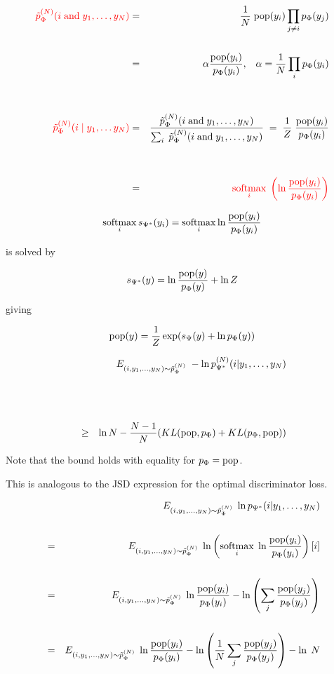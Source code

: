 {
{\huge
\begin{eqnarray*}
{\color{red} \tilde{p}_\Phi^{(N)}(i \;\mathrm{and}\;y_1,\ldots,y_{N})} & = & \frac{1}{N}\;\mathrm{pop}(y_i)\prod_{j \not = i}p_\Phi(y_j) \\
\\
& = & \alpha \frac{\mathrm{pop}(y_i)}{p_\Phi(y_i)},\;\;\;\alpha = \frac{1}{N} \prod_i p_\Phi(y_i) \\
\\
\\
{\color{red} \tilde{p}_\Phi^{(N)}(i\;|\;y_1,\ldots y_{N})} & = & \frac{\tilde{p}_\Phi^{(N)}(i\;\mbox{and} \; y_1,\ldots,y_{N})}{\sum_i \;\tilde{p}_\Phi^{(N)}(i \;\mbox{and}\; y_1,\ldots,y_{N})} \;=\;\frac{1}{Z} \;\frac{\mathrm{pop}(y_i)}{p_\Phi(y_i)} \\
\\
\\
& = & {\color{red} \operatorname*{softmax}_i\; \left(\ln \frac{\mathrm{pop}(y_i)}{p_\Phi(y_i)}\right)}
\end{eqnarray*}
}


$$\operatorname*{softmax}_i s_{\Psi^*}(y_i) =  \operatorname*{softmax}_i \ln \frac{\mathrm{pop}(y_i)}{p_\Phi(y_i)}$$

\vfill
is solved by

\vfill
$$s_{\Psi^*}(y) = \ln \frac{\mathrm{pop}(y)}{p_\Phi(y)} + \ln Z$$

\vfill
giving

$$\mathrm{pop}(y) = \frac{1}{Z} \exp(s_\Psi(y) + \ln p_\Phi(y))$$


\begin{eqnarray*}
  && E_{(i,y_1,\dots,y_{N}) \sim \tilde{p}_\Phi^{(N)}}\;- \ln p^{(N)}_{\Psi^*}(i|y_1,\ldots,y_{N}) \\
  \\
  \\
  \\
  & \geq & \ln N - \frac{N-1}{N}(KL(\mathrm{pop},p_\Phi) + KL(p_\Phi,\mathrm{pop}))
\end{eqnarray*}

\vfill
Note that the bound holds with equality for $p_\Phi = \mathrm{pop}$.

\vfill
This is analogous to the JSD expression for the optimal discriminator loss.

{\huge
 \begin{eqnarray*}
    & & E_{(i,y_1,\ldots,y_{N}) \sim \tilde{p}_\Phi^{(N)}}\;\ln p_{\Psi^*}(i|y_1,\ldots,y_{N}) \\
    \\
    & = & E_{(i,y_1,\ldots,y_{N}) \sim \tilde{p}_\Phi^{(N)}}\;\ln \left(\operatorname*{softmax}_i \;\ln \frac{\mathrm{pop}(y_i)}{p_\Phi(y_i)}\right)[i] \\
    \\
    & = & E_{(i,y_1,\ldots,y_{N}) \sim \tilde{p}_\Phi^{(N)}}\;\ln\frac{\mathrm{pop}(y_i)}{p_\Phi(y_i)} - \ln\left(\sum_j \frac{\mathrm{pop}(y_j)}{p_\Phi(y_j)} \right) \\
    \\
    & = & E_{(i,y_1,\ldots,y_{N}) \sim \tilde{p}_\Phi^{(N)}}\;\ln\frac{\mathrm{pop}(y_i)}{p_\Phi(y_i)} - \ln\left(\frac{1}{N}\sum_j \frac{\mathrm{pop}(y_j)}{p_\Phi(y_j)} \right) - \ln\;N
  \end{eqnarray*}
}

}

